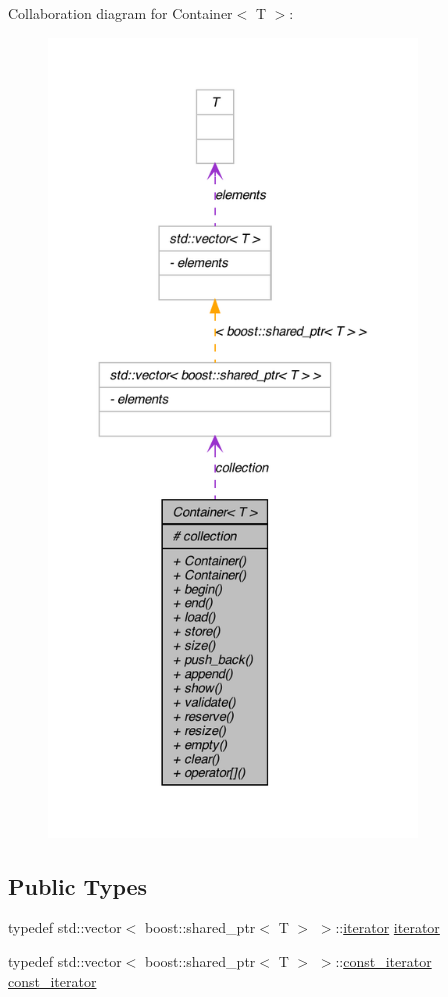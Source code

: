 Collaboration diagram for Container$<$ T $>$:\nopagebreak
\begin{figure}[H]
\begin{center}
\leavevmode
\includegraphics[height=600pt]{class_container__coll__graph}
\end{center}
\end{figure}
\subsection*{Public Types}
\begin{DoxyCompactItemize}
\item 
typedef std::vector$<$ boost::shared\_\-ptr$<$ T $>$ $>$::\hyperlink{class_container_afe880028d8304353129f47cd1d28c20a}{iterator} \hyperlink{class_container_afe880028d8304353129f47cd1d28c20a}{iterator}
\item 
typedef std::vector$<$ boost::shared\_\-ptr$<$ T $>$ $>$::\hyperlink{class_container_a5eabadaffdd508cb623c955eb0af1518}{const\_\-iterator} \hyperlink{class_container_a5eabadaffdd508cb623c955eb0af1518}{const\_\-iterator}
\end{DoxyCompactItemize}
